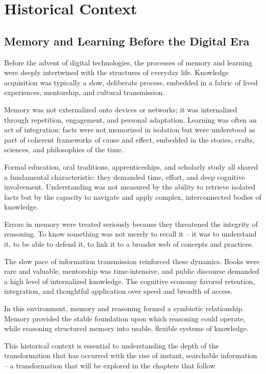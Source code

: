 \chapter{Historical Context}

\section{Memory and Learning Before the Digital Era}

Before the advent of digital technologies, the processes of memory and
learning were deeply intertwined with the structures of everyday life.
Knowledge acquisition was typically a slow, deliberate process, embedded
in a fabric of lived experiences, mentorship, and cultural transmission.

Memory was not externalized onto devices or networks; it was
internalized through repetition, engagement, and personal adaptation.
Learning was often an act of integration: facts were not memorized in
isolation but were understood as part of coherent frameworks of cause
and effect, embedded in the stories, crafts, sciences, and philosophies
of the time.

Formal education, oral traditions, apprenticeships, and scholarly study
all shared a fundamental characteristic: they demanded time, effort, and
deep cognitive involvement. Understanding was not measured by the
ability to retrieve isolated facts but by the capacity to navigate and
apply complex, interconnected bodies of knowledge.

Errors in memory were treated seriously because they threatened the
integrity of reasoning. To know something was not merely to recall it --
it was to understand it, to be able to defend it, to link it to a
broader web of concepts and practices.

The slow pace of information transmission reinforced these dynamics.
Books were rare and valuable, mentorship was time-intensive, and public
discourse demanded a high level of internalized knowledge. The cognitive
economy favored retention, integration, and thoughtful application over
speed and breadth of access.

In this environment, memory and reasoning formed a symbiotic
relationship. Memory provided the stable foundation upon which reasoning
could operate, while reasoning structured memory into usable, flexible
systems of knowledge.

This historical context is essential to understanding the depth of the
transformation that has occurred with the rise of instant, searchable
information -- a transformation that will be explored in the chapters
that follow.



